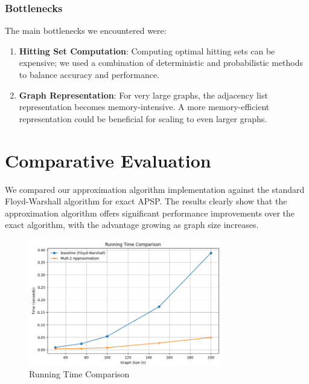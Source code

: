 \documentclass[a4paper,11pt,oneside]{book}
\begin{document}
\section*{Bottlenecks}

The main bottlenecks we encountered were:

\begin{enumerate}
    \item \textbf{Hitting Set Computation}: Computing optimal hitting sets can be expensive; we used a combination of deterministic and probabilistic methods to balance accuracy and performance.

    \item \textbf{Graph Representation}: For very large graphs, the adjacency list representation becomes memory-intensive. A more memory-efficient representation could be beneficial for scaling to even larger graphs.
\end{enumerate}

\part{Comparative Evaluation}

We compared our approximation algorithm implementation against the standard Floyd-Warshall algorithm for exact APSP. The results clearly show that the approximation algorithm offers significant performance improvements over the exact algorithm, with the advantage growing as graph size increases.

\begin{figure}[h]
\centering
\includegraphics[width=0.75\textwidth]{figures/running_time.png}
\caption{Running Time Comparison}
\end{figure}
\end{document}
